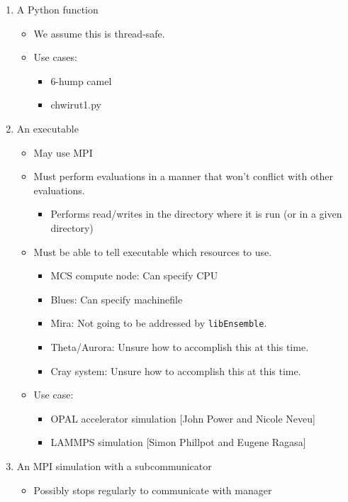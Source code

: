 \documentclass{article}
\newcommand{\libE}{\texttt{libEnsemble}\xspace}
\begin{document}
\begin{enumerate}
  \item A Python function
    \begin{itemize}
      \item We assume this is thread-safe.
      \item Use cases:
        \begin{itemize}
          \item 6-hump camel
          \item chwirut1.py
        \end{itemize}
    \end{itemize}
  \item An executable
    \begin{itemize}
      \item May use MPI
      \item Must perform evaluations in a manner that won't conflict with other evaluations.
        \begin{itemize}
          \item Performs read/writes in the directory where it is run (or in a given directory)
        \end{itemize}
      \item Must be able to tell executable which resources to use.
        \begin{itemize}
          \item MCS compute node: Can specify CPU
          \item Blues: Can specify machinefile
          \item Mira: Not going to be addressed by \libE.
          \item Theta/Aurora: Unsure how to accomplish this at this time.
          \item Cray system: Unsure how to accomplish this at this time.
        \end{itemize}
      \item Use case:
        \begin{itemize}
          \item OPAL accelerator simulation [John Power and Nicole Neveu]
          \item LAMMPS simulation [Simon Phillpot and Eugene Ragasa]
        \end{itemize}
    \end{itemize}
  \item An MPI simulation with a subcommunicator
    \begin{itemize}
      \item Possibly stops regularly to communicate with manager

\end{itemize}
\end{enumerate}
\end{document}
